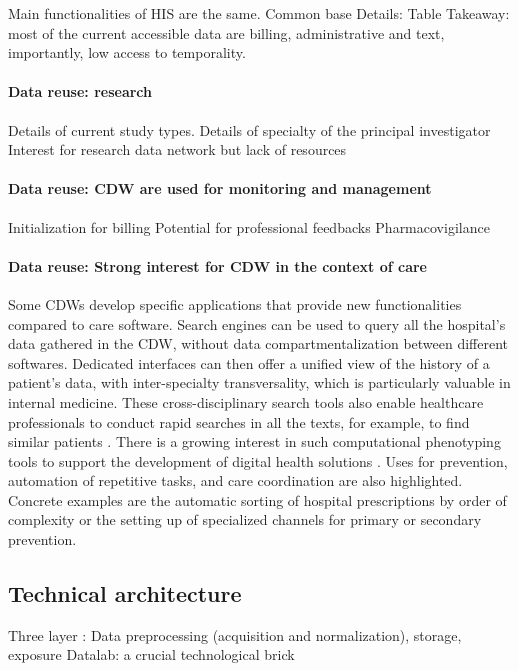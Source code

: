 \documentclass{report}
\begin{document}
Main functionalities of HIS are the same. Common base Details: Table Takeaway:
most of the current accessible data are billing, administrative and text,
importantly, low access to temporality.

\paragraph{Data reuse: research}
Details of current study types.
Details of specialty of the principal investigator
Interest for research data network but lack of resources

\paragraph{Data reuse: CDW are used for monitoring and management}
Initialization for billing
Potential for professional feedbacks
Pharmacovigilance

\paragraph{Data reuse: Strong interest for CDW in the context of care}

Some CDWs develop specific applications that provide new functionalities
compared to care software. Search engines can be used to query all the
hospital's data gathered in the CDW, without data compartmentalization between
different softwares. Dedicated interfaces can then offer a unified view of the
history of a patient's data, with inter-specialty transversality, which is
particularly valuable in internal medicine. These cross-disciplinary search
tools also enable healthcare professionals to conduct rapid searches in all the
texts, for example, to find similar patients \citep{garcelon2017finding}.
%
There is a growing interest in such computational phenotyping tools to support
the development of digital health solutions \citep{wen2023impact}.
%
Uses for prevention, automation of repetitive tasks, and care coordination are
also highlighted. Concrete examples are the automatic sorting of hospital
prescriptions by order of complexity or the setting up of specialized channels
for primary or secondary prevention.

\subsection{Technical architecture}\label{subsec:cdw:results:architecture}
Three layer : Data preprocessing (acquisition and normalization), storage, exposure
Datalab: a crucial technological brick
\end{document}
